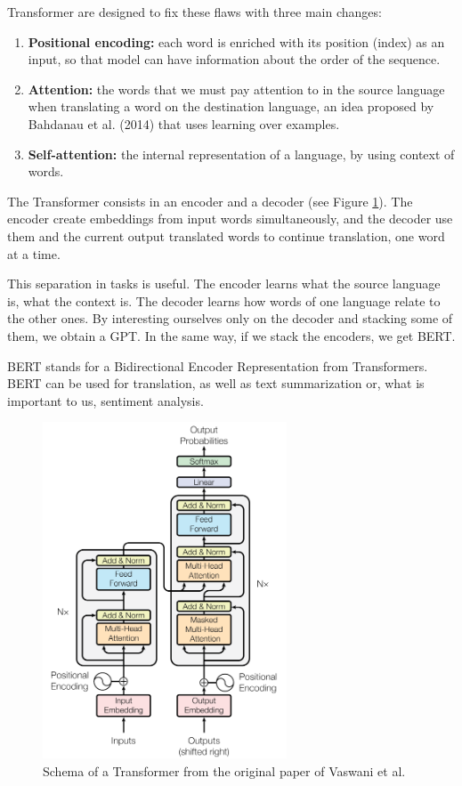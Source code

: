 \documentclass[11pt]{scrartcl}
\begin{document}
Transformer are designed to fix these flaws with three main changes:
\begin{enumerate}
    \item \textbf{Positional encoding:} each word is enriched with its position (index) as an input, so that model can have information about the order of the sequence.
    \item \textbf{Attention:} the words that we must pay attention to in the source language when translating a word on the destination language, an idea proposed by Bahdanau et al. (2014)\cite{bahdanau2014neural} that uses learning over examples.
    \item \textbf{Self-attention:} the internal representation of a language, by using context of words.
\end{enumerate}

The Transformer consists in an encoder and a decoder (see Figure \ref{fig:transformer}). The encoder create embeddings from input words simultaneously, and the decoder use them and the current output translated words to continue translation, one word at a time.

This separation in tasks is useful. The encoder learns what the source language is, what the context is. The decoder learns how words of one language relate to the other ones. By interesting ourselves only on the decoder and stacking some of them, we obtain a GPT. In the same way, if we stack the encoders, we get BERT.

BERT stands for a Bidirectional Encoder Representation from Transformers. BERT can be used for translation, as well as text summarization or, what is important to us, sentiment analysis. 

\begin{figure}[]
    \centering
    \includegraphics[height=10cm]{img/Transformer.PNG}
    \caption{Schema of a Transformer from the original paper of Vaswani et al.\cite{vaswani2017attention}}
    \label{fig:transformer}
\end{figure}
\end{document}
